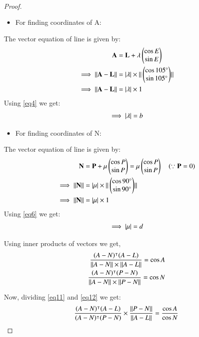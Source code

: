 \documentclass[journal,12pt,twocolumn]{IEEEtran}
\begin{document}
\begin{enumerate}
\begin{lemma}
\begin{align}
\end{align}
\end{lemma}
\begin{proof}
\begin{itemize}
\item For finding coordinates of A:
\end{itemize}
The vector equation of line is given by:
\begin{align}
\mathbf{A} &= \mathbf{L} +\lambda \begin{pmatrix}\cos E\\\sin E\end{pmatrix} 
\\
\implies\Vert\mathbf{A}-\mathbf{L}\rVert &= \vert\lambda\vert\times\Vert\begin{pmatrix}\cos 105\degree\\\sin 105\degree\end{pmatrix}\rVert 
\\
\implies\Vert\mathbf{A}-\mathbf{L}\rVert &= \vert\lambda\vert\times1
\end{align}
Using \eqref{eq4} we get:
\begin{align}
\implies \vert\lambda\vert=b 
\end{align}
\begin{itemize}
\item For finding coordinates of N:
\end{itemize}
The vector equation of line is given by:
\begin{align}
\mathbf{N}&=\mathbf{P}+\mu \begin{pmatrix}\cos P\\\sin P\end{pmatrix}=\mu \begin{pmatrix}\cos P\\\sin P\end{pmatrix} \quad(\because \mathbf{P}=0) 
\\
\implies\Vert\mathbf{N}\rVert &= \vert\mu\vert\times\Vert\begin{pmatrix}\cos 90\degree\\\sin 90\degree\end{pmatrix}\rVert 
\\
\implies\Vert\mathbf{N}\rVert &= \vert\mu\vert\times1
\end{align}
Using \eqref{eq6} we get:
\begin{align}
\implies \vert\mu\vert=d
\end{align}
\item Using inner products of vectors we get,
\begin{align}
\frac{(A-N)^\intercal(A-L)}{\Vert A-N\rVert\times\Vert A-L\rVert}=\cos A \label{eq11}
\\
\frac{(A-N)^\intercal(P-N)}{\Vert A-N\rVert\times\Vert P-N\rVert}=\cos N \label{eq12}
\end{align}
\item Now, dividing \eqref{eq11} and \eqref{eq12} we get:
\begin{align}
\frac{(A-N)^\intercal(A-L)}{(A-N)^\intercal(P-N)}\times\frac{\norm{P-N}}{\norm{A-L}}=\frac{\cos A}{\cos N} \\

\end{align}
\end{proof}
\end{enumerate}
\end{document}
